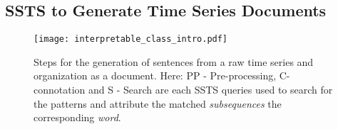 %
%
%
%
%
%
%

\subsection{SSTS to Generate Time Series Documents}



\begin{figure}[!h]
    \centering
    \texttt{[image: interpretable\_class\_intro.pdf]}
    \caption{Steps for the generation of sentences from a raw time series and organization as a document. Here: {PP - Pre-processing, C- connotation and S - Search} are each \gls{SSTS} queries used to search for the patterns and attribute the matched \textit{subsequences} the corresponding \textit{word}.}
    \label{fig:sentence_gen}
\end{figure}


